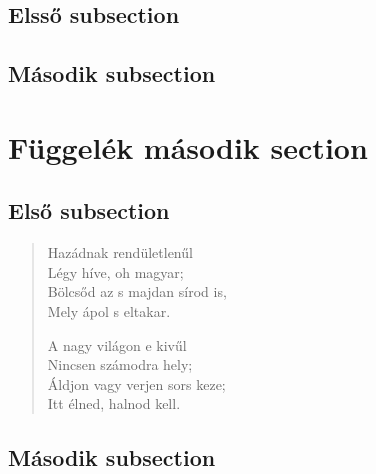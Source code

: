 \documentclass[twoside]{article}
\begin{document}
\subsection{Elsső subsection}
\quote{\hulipsum[2]}
\subsection{Második subsection}
\quotation{\hulipsum[2]}

\section{Függelék második section}
\subsection{Első subsection}
\begin{verse}
Hazádnak rendületlenűl\\
Légy híve, oh magyar;\\
Bölcsőd az s majdan sírod is,\\
Mely ápol s eltakar.\newline

A nagy világon e kivűl\\
Nincsen számodra hely;\\
Áldjon vagy verjen sors keze;\\
Itt élned, halnod kell.
\end{verse}
\subsection{Második subsection}
\end{document}
